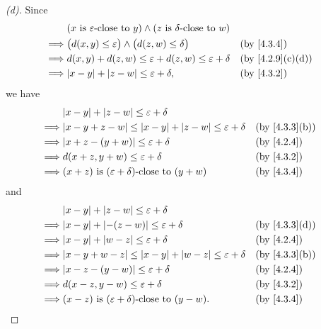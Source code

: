 \begin{proof}[(d)]
  Since
  \begin{align*}
             & (x \text{ is \(\varepsilon\)-close to } y) \land (z \text{ is \(\delta\)-close to } w)                      \\
    \implies & \big(d(x, y) \leq \varepsilon\big) \land \big(d(z, w) \leq \delta\big)                 &  & \by{4.3.4}      \\
    \implies & d(x, y) + d(z, w) \leq \varepsilon + d(z, w) \leq \varepsilon + \delta                 &  & \by{4.2.9}[c,d] \\
    \implies & \abs{x - y} + \abs{z - w} \leq \varepsilon + \delta,                                   &  & \by{4.3.2}
  \end{align*}
  we have
  \begin{align*}
             & \abs{x - y} + \abs{z - w} \leq \varepsilon + \delta                                             \\
    \implies & \abs{x - y + z - w} \leq \abs{x - y} + \abs{z - w} \leq \varepsilon + \delta &  & \by{4.3.3}[b] \\
    \implies & \abs{x + z - (y + w)} \leq \varepsilon + \delta                              &  & \by{4.2.4}    \\
    \implies & d(x + z, y + w) \leq \varepsilon + \delta                                    &  & \by{4.3.2}    \\
    \implies & (x + z) \text{ is \((\varepsilon + \delta)\)-close to } (y + w)              &  & \by{4.3.4}
  \end{align*}
  and
  \begin{align*}
             & \abs{x - y} + \abs{z - w} \leq \varepsilon + \delta                                             \\
    \implies & \abs{x - y} + \abs{-(z - w)} \leq \varepsilon + \delta                       &  & \by{4.3.3}[d] \\
    \implies & \abs{x - y} + \abs{w - z} \leq \varepsilon + \delta                          &  & \by{4.2.4}    \\
    \implies & \abs{x - y + w - z} \leq \abs{x - y} + \abs{w - z} \leq \varepsilon + \delta &  & \by{4.3.3}[b] \\
    \implies & \abs{x - z - (y - w)} \leq \varepsilon + \delta                              &  & \by{4.2.4}    \\
    \implies & d(x - z, y - w) \leq \varepsilon + \delta                                    &  & \by{4.3.2}    \\
    \implies & (x - z) \text{ is \((\varepsilon + \delta)\)-close to } (y - w).             &  & \by{4.3.4}
  \end{align*}
\end{proof}

